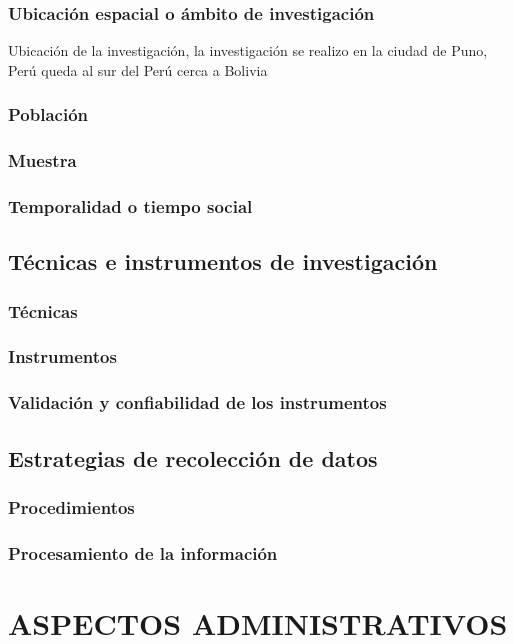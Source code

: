 \documentclass[12pt]{article}
\begin{document}
\subsubsection{Ubicación espacial o ámbito de investigación}
Ubicación de la investigación, la investigación se realizo en la ciudad de Puno, Perú queda al sur del Perú cerca a Bolivia 

\subsubsection{Población}
\lipsum[1]
\subsubsection{Muestra}
\lipsum[1]
\subsubsection{Temporalidad o tiempo social}
\lipsum[1]
\subsection{Técnicas e instrumentos de investigación}
\lipsum[1]
\subsubsection{Técnicas}
\lipsum[1]
\subsubsection{Instrumentos}
\lipsum[1]
\subsubsection{Validación y confiabilidad de los instrumentos}
\lipsum[1]
\subsection{Estrategias de recolección de datos}
\lipsum[1]
\subsubsection{Procedimientos }
\lipsum[1]
\subsubsection{Procesamiento de la información}
\lipsum[1]
\section{ASPECTOS ADMINISTRATIVOS}
\lipsum[1]
\end{document}
